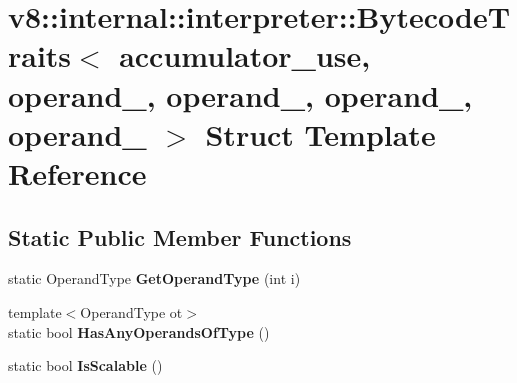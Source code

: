 \hypertarget{structv8_1_1internal_1_1interpreter_1_1_bytecode_traits_3_01accumulator__use_00_01operand__0_00_ad1f88ba519d8dcf4785ba91ce1cb8bd}{}\section{v8\+:\+:internal\+:\+:interpreter\+:\+:Bytecode\+Traits$<$ accumulator\+\_\+use, operand\+\_, operand\+\_, operand\+\_, operand\+\_ $>$ Struct Template Reference}
\label{structv8_1_1internal_1_1interpreter_1_1_bytecode_traits_3_01accumulator__use_00_01operand__0_00_ad1f88ba519d8dcf4785ba91ce1cb8bd}
\subsection*{Static Public Member Functions}
\begin{DoxyCompactItemize}
\item 
static Operand\+Type {\bfseries Get\+Operand\+Type} (int i)\hypertarget{structv8_1_1internal_1_1interpreter_1_1_bytecode_traits_3_01accumulator__use_00_01operand__0_00_ad1f88ba519d8dcf4785ba91ce1cb8bd_a7d2c8c4be5d67019a21059c4ab63b591}{}\label{structv8_1_1internal_1_1interpreter_1_1_bytecode_traits_3_01accumulator__use_00_01operand__0_00_ad1f88ba519d8dcf4785ba91ce1cb8bd_a7d2c8c4be5d67019a21059c4ab63b591}

\item 
{\footnotesize template$<$Operand\+Type ot$>$ }\\static bool {\bfseries Has\+Any\+Operands\+Of\+Type} ()\hypertarget{structv8_1_1internal_1_1interpreter_1_1_bytecode_traits_3_01accumulator__use_00_01operand__0_00_ad1f88ba519d8dcf4785ba91ce1cb8bd_ac529c5488fd1526a7235638cc36f1b57}{}\label{structv8_1_1internal_1_1interpreter_1_1_bytecode_traits_3_01accumulator__use_00_01operand__0_00_ad1f88ba519d8dcf4785ba91ce1cb8bd_ac529c5488fd1526a7235638cc36f1b57}

\item 
static bool {\bfseries Is\+Scalable} ()\hypertarget{structv8_1_1internal_1_1interpreter_1_1_bytecode_traits_3_01accumulator__use_00_01operand__0_00_ad1f88ba519d8dcf4785ba91ce1cb8bd_a48325ed7acb815720985a7cf592bc982}{}\label{structv8_1_1internal_1_1interpreter_1_1_bytecode_traits_3_01accumulator__use_00_01operand__0_00_ad1f88ba519d8dcf4785ba91ce1cb8bd_a48325ed7acb815720985a7cf592bc982}

\end{DoxyCompactItemize}

